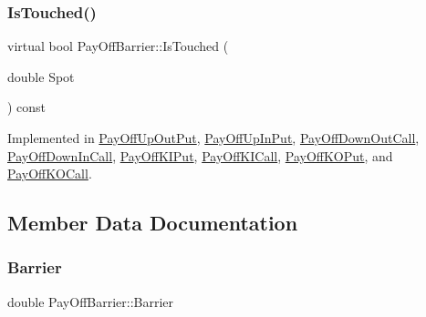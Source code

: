 \hypertarget{classPayOffBarrier_a2aa9162c618c4f72a6593dc625e1e1e8}{}\label{classPayOffBarrier_a2aa9162c618c4f72a6593dc625e1e1e8} 
\subsubsection{\texorpdfstring{Is\+Touched()}{IsTouched()}}
{\footnotesize\ttfamily virtual bool Pay\+Off\+Barrier\+::\+Is\+Touched (\begin{DoxyParamCaption}\item[{double}]{Spot }\end{DoxyParamCaption}) const\hspace{0.3cm}{\ttfamily [pure virtual]}}



Implemented in \hyperlink{classPayOffUpOutPut_a4b2900efde69ce09f2b0404729d0d61d}{Pay\+Off\+Up\+Out\+Put}, \hyperlink{classPayOffUpInPut_a8e8079a2508dfc533f60ca52b496f603}{Pay\+Off\+Up\+In\+Put}, \hyperlink{classPayOffDownOutCall_a516af0320ef04d315b66a924e346aa78}{Pay\+Off\+Down\+Out\+Call}, \hyperlink{classPayOffDownInCall_a2be6d6571ea7969db355d39980326def}{Pay\+Off\+Down\+In\+Call}, \hyperlink{classPayOffKIPut_a0f62d8559620b09b97f31ce052ad061c}{Pay\+Off\+K\+I\+Put}, \hyperlink{classPayOffKICall_af16b41bce04b47515f543d2da2c449a9}{Pay\+Off\+K\+I\+Call}, \hyperlink{classPayOffKOPut_ad3237bb8f95b93cb2930b5c2a57fd7f8}{Pay\+Off\+K\+O\+Put}, and \hyperlink{classPayOffKOCall_aa67fba615a4a0d6272bfc5f7c5604bd0}{Pay\+Off\+K\+O\+Call}.



\subsection{Member Data Documentation}
\hypertarget{classPayOffBarrier_a0f514158e3a0ba82736c3566b53ccfc9}{}\label{classPayOffBarrier_a0f514158e3a0ba82736c3566b53ccfc9} 
\subsubsection{\texorpdfstring{Barrier}{Barrier}}
{\footnotesize\ttfamily double Pay\+Off\+Barrier\+::\+Barrier\hspace{0.3cm}{\ttfamily [protected]}}

\hypertarget{classPayOffBarrier_aca3ea631dcdb28a1df971b74774e41f8}{}\label{classPayOffBarrier_aca3ea631dcdb28a1df971b74774e41f8} 
